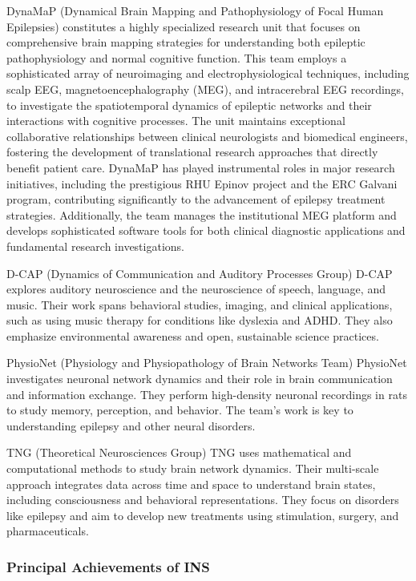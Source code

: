 \documentclass[a4paper,12pt,twoside]{article}
\begin{document}
DynaMaP (Dynamical Brain Mapping and Pathophysiology of Focal Human Epilepsies) constitutes a highly specialized research unit that focuses on comprehensive brain mapping strategies for understanding both epileptic pathophysiology and normal cognitive function. This team employs a sophisticated array of neuroimaging and electrophysiological techniques, including scalp EEG, magnetoencephalography (MEG), and intracerebral EEG recordings, to investigate the spatiotemporal dynamics of epileptic networks and their interactions with cognitive processes. The unit maintains exceptional collaborative relationships between clinical neurologists and biomedical engineers, fostering the development of translational research approaches that directly benefit patient care. DynaMaP has played instrumental roles in major research initiatives, including the prestigious RHU Epinov project and the ERC Galvani program, contributing significantly to the advancement of epilepsy treatment strategies. Additionally, the team manages the institutional MEG platform and develops sophisticated software tools for both clinical diagnostic applications and fundamental research investigations.

    D-CAP (Dynamics of Communication and Auditory Processes Group)
    D-CAP explores auditory neuroscience and the neuroscience of speech, language, and music. Their work spans behavioral studies, imaging, and clinical applications, such as using music therapy for conditions like dyslexia and ADHD. They also emphasize environmental awareness and open, sustainable science practices.

    PhysioNet (Physiology and Physiopathology of Brain Networks Team)
    PhysioNet investigates neuronal network dynamics and their role in brain communication and information exchange. They perform high-density neuronal recordings in rats to study memory, perception, and behavior. The team’s work is key to understanding epilepsy and other neural disorders.

    TNG (Theoretical Neurosciences Group)
    TNG uses mathematical and computational methods to study brain network dynamics. Their multi-scale approach integrates data across time and space to understand brain states, including consciousness and behavioral representations. They focus on disorders like epilepsy and aim to develop new treatments using stimulation, surgery, and pharmaceuticals.

\subsubsection{Principal Achievements of INS}
\end{document}
